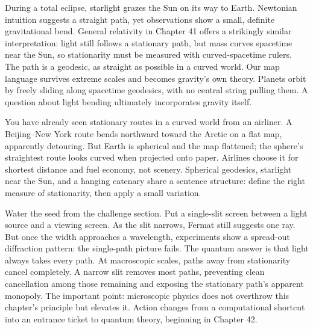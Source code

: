 
\begin{thought}
During a total eclipse, starlight grazes the Sun on its way to Earth. Newtonian intuition suggests a straight path, yet observations show a small, definite gravitational bend. General relativity in Chapter 41 offers a strikingly similar interpretation: light still follows a stationary path, but mass curves spacetime near the Sun, so stationarity must be measured with curved-spacetime rulers. The path is a geodesic, as straight as possible in a curved world. Our map language survives extreme scales and becomes gravity's own theory. Planets orbit by freely sliding along spacetime geodesics, with no central string pulling them. A question about light bending ultimately incorporates gravity itself.

You have already seen stationary routes in a curved world from an airliner. A Beijing--New York route bends northward toward the Arctic on a flat map, apparently detouring. But Earth is spherical and the map flattened; the sphere's straightest route looks curved when projected onto paper. Airlines choose it for shortest distance and fuel economy, not scenery. Spherical geodesics, starlight near the Sun, and a hanging catenary share a sentence structure: define the right measure of stationarity, then apply a small variation.
\end{thought}

\begin{thought}
Water the seed from the challenge section. Put a single-slit screen between a light source and a viewing screen. As the slit narrows, Fermat still suggests one ray. But once the width approaches a wavelength, experiments show a spread-out diffraction pattern: the single-path picture fails. The quantum answer is that light always takes every path. At macroscopic scales, paths away from stationarity cancel completely. A narrow slit removes most paths, preventing clean cancellation among those remaining and exposing the stationary path's apparent monopoly. The important point: microscopic physics does not overthrow this chapter's principle but elevates it. Action changes from a computational shortcut into an entrance ticket to quantum theory, beginning in Chapter 42.
\end{thought}

